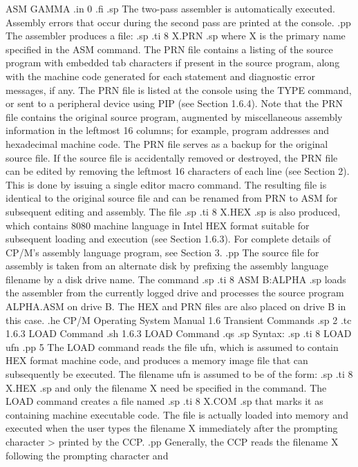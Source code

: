 ASM GAMMA
.in 0
.fi
.sp
The two-pass assembler is automatically executed.  Assembly errors that occur
during the second pass are printed at the console.
.pp
The assembler produces a file:
.sp
.ti 8
X.PRN
.sp
where X is the primary name specified in the ASM command.  The PRN file
contains a listing of the source program with embedded tab characters if
present in the source program, along with the machine code generated for
each statement and diagnostic error messages, if any.  The PRN file is listed
at the console using the TYPE command, or sent to a peripheral device
using PIP (see Section 1.6.4).  Note that the PRN file
contains the original source program, augmented by miscellaneous assembly
information in the leftmost 16 columns; for example, program addresses and
hexadecimal
machine code.  The PRN file serves as a backup for the original
source file.  If the source file is accidentally removed or destroyed, the
PRN file can be edited by removing the leftmost 16 characters
of each line (see Section 2).  This is done by issuing a single editor macro
command.
The resulting file is identical to the original source file and can be
renamed from PRN to ASM for subsequent editing and assembly.  The file
.sp
.ti 8
X.HEX
.sp
is also produced, which contains 8080 machine language in Intel HEX format
suitable for subsequent loading and execution (see Section 1.6.3).  For
complete details of CP/M's assembly language program, see Section 3.
.pp
The source file for assembly is taken from an alternate disk by prefixing the
assembly language filename by a disk drive name.  The command
.sp
.ti 8
ASM B:ALPHA
.sp
loads the assembler from the currently logged drive and processes the source
program ALPHA.ASM on drive B.  The HEX and PRN files are also placed on
drive B in this case.
.he CP/M Operating System Manual              1.6  Transient Commands
.sp 2
.tc         1.6.3  LOAD Command
.sh
1.6.3  LOAD Command
.qs
.sp
Syntax:
.sp
.ti 8
LOAD ufn
.pp 5
The LOAD command reads the file ufn, which is assumed to contain HEX format
machine code, and produces a memory image file that can subsequently be
executed.  The filename ufn is assumed to be of the form:
.sp
.ti 8
X.HEX
.sp
and only the filename X need be specified in the command.  The LOAD command
creates a file named
.sp
.ti 8
X.COM
.sp
that marks it as containing machine executable code.  The file is actually
loaded into memory and executed when the user types the filename X
immediately after the prompting character > printed by the CCP.
.pp
Generally, the CCP reads the filename X following the prompting character and
